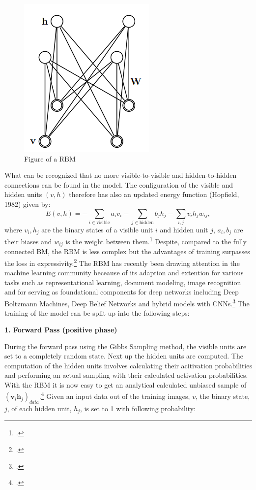 \begin{figure}[H]
    \centering
    \includegraphics[width=0.25\linewidth]{graphics/RBM_Modell.png}
    \caption{Figure of a \ac{RBM}}
\end{figure}
What can be recognized that no more visible-to-visible and hidden-to-hidden connections can be found in the model.
The configuration of the visible and hidden units \( (v, h) \) therefore has also an updated energy function (Hopfield, 1982) given by:
\begin{equation}
E(v, h) = - \sum_{i \in \text{visible}} a_i v_i - \sum_{j \in \text{hidden}} b_j h_j - \sum_{i,j} v_i h_j w_{ij},
\end{equation}
where \( v_i, h_j \) are the binary states of a visible unit \( i \) and hidden unit \( j \), \( a_i, b_j \) are their biases and \( w_{ij} \) is the weight between them.\footcite[cf.][3-4]{hintonPracticalGuideTraining2012a}
Despite, compared to the fully connected \ac{BM}, the \ac{RBM} is less complex but the advantages of training surpasses the loss in expressivity.\footcite[cf.][4]{huembeliPhysicsEnergybasedModels2022}
The \ac{RBM} has recently been drawing attention in the machine learning community beceause of its adaption and extention for various tasks such as representational learning, document modeling, image recognition and for
serving as foundational components for deep networks including Deep Boltzmann Machines, Deep Belief Networks and hybrid models with CNNs.\footcite[cf.][1186]{zhangOverviewRestrictedBoltzmann2018}
The training of the model can be split up into the following steps:

\textbf{1. Forward Pass (positive phase)}

During the forward pass using the Gibbs Sampling method, the visible units are set to a completely random state. Next up the hidden units are computed.
The computation of the hidden units involves calculating their acitivation probabilities and performing an actual sampling with their calculated activation probabilities.
With the \ac{RBM} it is now easy to get an analytical calculated unbiased sample of $(\textbf{v}_i\textbf{h}_j)_{data}$.\footcite[cf.][5]{hintonPracticalGuideTraining2012}
Given an input data out of the training images, \( v \), the binary state, \( j \), of each hidden unit,  \( h_j \), is set to 1 with following probability:

